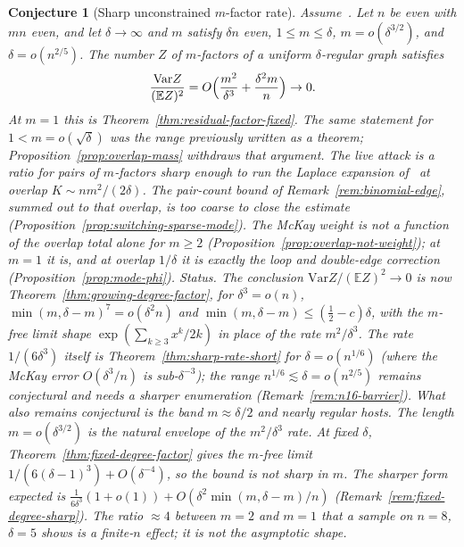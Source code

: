 \documentclass[11pt]{article}
\newtheorem{conjecture}[theorem]{Conjecture}
\newcommand{\EE}{\mathbb{E}}
\newcommand{\Var}{\mathrm{Var}}
\begin{document}
\begin{conjecture}[Sharp unconstrained \(m\)-factor rate]
\label{conj:residual-factor-sharp}
Assume~\cite[Theorem~6]{Gao20}. Let \(n\) be even with \(mn\) even, and let
\(\delta\to\infty\) and \(m\) satisfy \(\delta n\) even, \(1\le m\le\delta\),
\(m=o(\delta^{3/2})\), and \(\delta=o(n^{2/5})\). The number \(Z\) of \(m\)-factors of
a uniform \(\delta\)-regular graph satisfies
\[
\frac{\Var Z}{(\EE Z)^2}
=
O\Bigl(\frac{m^2}{\delta^3}+\frac{\delta^2 m}{n}\Bigr)\to0.
\]
At \(m=1\) this is Theorem~\ref{thm:residual-factor-fixed}. The same
statement for \(1<m=o(\sqrt\delta)\) was the range previously written as a
theorem; Proposition~\ref{prop:overlap-mass} withdraws that argument.
The live attack is a ratio for pairs of \(m\)-factors sharp enough to run
the Laplace expansion of~\cite[§3.4]{Gao21} at overlap
\(K\sim nm^2/(2\delta)\). The pair-count bound of
Remark~\ref{rem:binomial-edge}, summed out to that overlap, is too coarse
to close the estimate
(Proposition~\ref{prop:switching-sparse-mode}).
The McKay weight is not a function of the overlap total alone for \(m\ge 2\)
(Proposition~\ref{prop:overlap-not-weight}); at \(m=1\) it is, and at overlap
\(1/\delta\) it is exactly the loop and double-edge correction
(Proposition~\ref{prop:mode-phi}).
\emph{Status.} The conclusion \(\Var Z/(\EE Z)^2\to0\) is now
Theorem~\ref{thm:growing-degree-factor}, for \(\delta^3=o(n)\),
\(\min(m,\delta-m)^7=o(\delta^2n)\) and \(\min(m,\delta-m)\le(\tfrac12-c)\delta\),
with the \(m\)-free limit shape \(\exp(\sum_{k\ge3}x^k/2k)\) in place of the
rate \(m^2/\delta^3\). The \emph{rate} \(1/(6\delta^3)\) itself is
Theorem~\ref{thm:sharp-rate-short} for \(\delta=o(n^{1/6})\) (where the McKay
error \(O(\delta^3/n)\) is sub-\(\delta^{-3}\)); the range
\(n^{1/6}\lesssim\delta=o(n^{2/5})\) remains conjectural and needs a sharper
enumeration (Remark~\ref{rem:n16-barrier}). What also remains conjectural is
the band \(m\approx\delta/2\) and nearly regular hosts.
The length \(m=o(\delta^{3/2})\) is the
natural envelope of the \(m^2/\delta^3\) rate.
At fixed \(\delta\), Theorem~\ref{thm:fixed-degree-factor} gives the
\(m\)-free limit \(1/(6(\delta-1)^3)+O(\delta^{-4})\), so the bound is not sharp
in \(m\). The sharper form expected is
\(\frac1{6\delta^3}(1+o(1))+O(\delta^2\min(m,\delta-m)/n)\)
(Remark~\ref{rem:fixed-degree-sharp}).
The ratio \(\approx4\) between \(m=2\) and \(m=1\) that a sample on \(n=8\),
\(\delta=5\) shows is a finite-\(n\) effect; it is not the asymptotic shape.
\end{conjecture}
\end{document}
